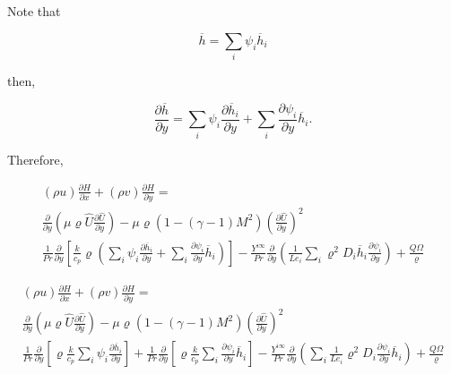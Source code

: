 Note that  

\begin{equation}
\overline{h}=\sum_{i} \psi_i \overline{h}_i
\end{equation}

then, 

\begin{equation}
\frac{\partial \overline{h}}{\partial y}
=
\sum_{i} \psi_i \frac{\partial \overline{h}_i}{\partial y}
+
\sum_{i} 
\frac{\partial \psi_i}{\partial y} \overline{h}_i
.
\end{equation}

Therefore,

\begin{equation} 
\begin{split}
(\rho u)\frac{\partial H}{\partial x}    
+
(\rho v)\frac{\partial H}{\partial y}    
=
 \\
\frac{\partial}{\partial y}
\left(
       \mu  \varrho\hat{U}\frac{\partial \hat{U}}{\partial  y}
 \right)
-
\mu 
\varrho
\left(
1-
(\gamma-1)M^2
\right)
\left(
\frac{\partial \hat{U}}{\partial y}
\right)
^2
\\
\frac{1}{Pr}
\frac{\partial}{\partial y}
\left[
       \frac{k}{c_p}
       \varrho
       \left(
       \sum_{i} \psi_i \frac{\partial \overline{h}_i}{\partial y}
       +
       \sum_{i} 
       \frac{\partial \psi_i}{\partial y} \overline{h}_i
       \right)
\right]
-
\frac{Y^{i\infty}}{Pr}
\frac{\partial}{\partial y}
       \left(
              \frac{1}{Le_i}
              \sum_i\varrho^2 D_i\overline{h}_i\frac{\partial \psi_i}{\partial y}
       \right)
+
\frac{Q\Omega}{\varrho}
\end{split}
\end{equation}       

\begin{equation} 
\begin{split}
(\rho u)\frac{\partial H}{\partial x}    
+
(\rho v)\frac{\partial H}{\partial y}    
=
 \\
\frac{\partial}{\partial y}\left(\mu \varrho\hat{U}\frac{\partial \hat{U}}{\partial  y}\right)
-
\mu 
\varrho
\left(
1-
(\gamma-1)M^2
\right)
\left(
\frac{\partial \hat{U}}{\partial y}
\right)
^2
\\
\frac{1}{Pr}
\frac{\partial}{\partial y}
\left[
       \varrho
       \frac{k}{c_p}
       \sum_{i} \psi_i \frac{\partial \overline{h}_i}{\partial y}
\right]
+
\frac{1}{Pr}
\frac{\partial}{\partial y}
\left[
       \varrho
       \frac{k}{c_p}
       \sum_{i} 
       \frac{\partial \psi_i}{\partial y} \overline{h}_i
\right]
-
\frac{Y^{i\infty}}{Pr}
\frac{\partial}{\partial y}
\left(\sum_i\frac{1}{Le_i}\varrho^2 D_i\frac{\partial \psi_i}{\partial y}\overline{h}_i\right)
+
\frac{Q\Omega}{\varrho}
\end{split}
\end{equation}       

